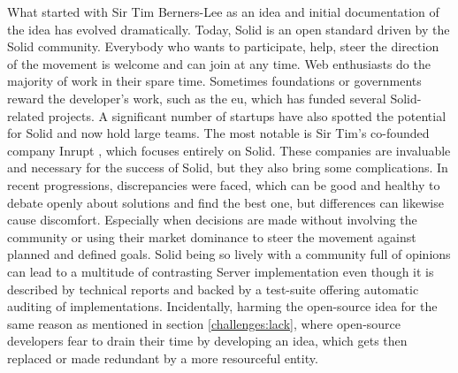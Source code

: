 What started with Sir Tim Berners-Lee as an idea and initial documentation of the idea has evolved dramatically. Today, Solid is an open standard driven by the Solid community. Everybody who wants to participate, help, steer the direction of the movement is welcome and can join at any time. Web enthusiasts do the majority of work in their spare time. Sometimes foundations or governments reward the developer’s work, such as the \gls{eu}, which has funded several Solid-related projects. A significant number of startups have also spotted the potential for Solid and now hold large teams. The most notable is Sir Tim's co-founded company Inrupt \cite{inrupt}, which focuses entirely on Solid. These companies are invaluable and necessary for the success of Solid, but they also bring some complications. In recent progressions, discrepancies were faced, which can be good and healthy to debate openly about solutions and find the best one, but differences can likewise cause discomfort. Especially when decisions are made without involving the community or using their market dominance to steer the movement against planned and defined goals.
Solid being so lively with a community full of opinions can lead to a multitude of contrasting Server implementation even though it is described by technical reports and backed by a test-suite offering automatic auditing of implementations. Incidentally, harming the open-source idea for the same reason as mentioned in section \ref{challenges:lack}, where open-source developers fear to drain their time by developing an idea, which gets then replaced or made redundant by a more resourceful entity.
